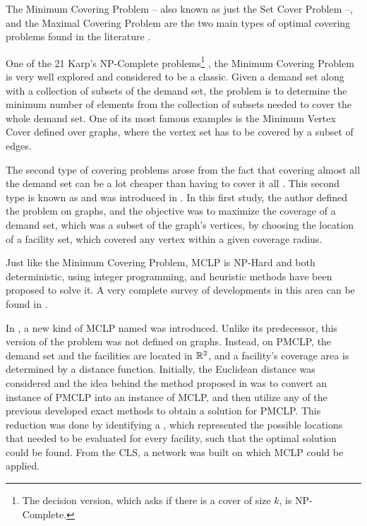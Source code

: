 The Minimum Covering Problem -- also known as just the Set Cover Problem --, and the Maximal Covering Problem are the two main types of optimal covering problems found in the literature \cite{karatas}. 

One of the 21 Karp's NP-Complete problems\footnote{The decision version, which asks if there is a cover of size $k$, is NP-Complete.} \cite{karp}, the Minimum Covering Problem is very well explored and considered to be a classic. 
Given a demand set along with a collection of subsets of the demand set, the problem is to determine the minimum number of elements from the collection of subsets needed to cover the whole demand set. One of its most famous examples is the Minimum Vertex Cover defined over graphs, where the vertex set has to be covered by a subset of edges.

The second type of covering problems arose from the fact that covering almost all the demand set can be a lot cheaper than having to cover it all \cite{garcia}. This second type is known as  and was introduced in .
In this first study, the author defined the problem on graphs, and the objective was to maximize the coverage of a demand set, which was a subset of the graph's vertices, by choosing the location of a facility set, which covered any vertex within a given coverage radius.

Just like the Minimum Covering Problem, MCLP is NP-Hard \cite{hatta:2013} and both deterministic, using integer programming, and heuristic methods have been proposed to solve it. A very complete survey of developments in this area can be found in .

In , a new kind of MCLP named  was introduced. Unlike its predecessor, this version of the problem was not defined on graphs. Instead, on PMCLP, the demand set and the facilities are located in $\mathbb{R}^2$, and a facility's coverage area is determined by a distance function.
Initially, the Euclidean distance was considered and the idea behind the method proposed in  was to convert an instance of PMCLP into an instance of MCLP, and then utilize any of the previous developed exact methods to obtain a solution for PMCLP. This reduction was done by identifying a , which represented the possible locations that needed to be evaluated for every facility, such that the optimal solution could be found. From the CLS, a network was built on which MCLP could be applied. 

